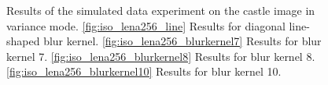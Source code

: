 \documentclass[12pt,notitlepage]{report}
\begin{document}
\clearpage

\begin{figure}[htb]
  \centering

  \caption[Results for the castle image in variance mode]{Results of the simulated data experiment on the castle image in variance mode. \ref{fig:iso_lena256_line} Results for diagonal line-shaped blur kernel. \ref{fig:iso_lena256_blurkernel7} Results for blur kernel 7. \ref{fig:iso_lena256_blurkernel8} Results for blur kernel 8. \ref{fig:iso_lena256_blurkernel10} Results for blur kernel 10.}
  \label{fig:var_castle256}
\end{figure}
\end{document}
